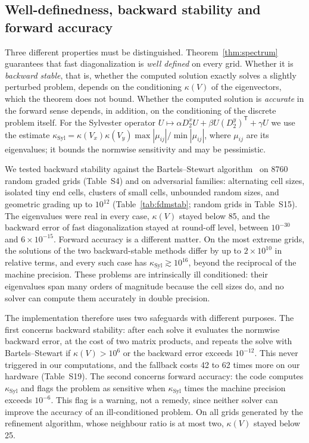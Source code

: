 \documentclass[smallextended,envcountsame]{svjour3}
\begin{document}
\subsection{Well-definedness, backward stability and forward accuracy}\label{sec:robust}
Three different properties must be distinguished. Theorem~\ref{thm:spectrum} guarantees that fast
diagonalization is \emph{well defined} on every grid. Whether it is \emph{backward stable}, that is, whether
the computed solution exactly solves a slightly perturbed problem, depends on the conditioning $\kappa(V)$ of
the eigenvectors, which the theorem does not bound. Whether the computed solution is \emph{accurate} in the
forward sense depends, in addition, on the conditioning of the discrete problem itself. For the Sylvester
operator $U\mapsto\alpha D_2^xU+\beta U(D_2^y)^{\mathsf T}+\gamma U$ we use the estimate
$\kappa_{\mathrm{Syl}}=\kappa(V_x)\kappa(V_y)\max|\mu_{ij}|/\min|\mu_{ij}|$, where $\mu_{ij}$ are its
eigenvalues; it bounds the normwise sensitivity and may be pessimistic.

We tested backward stability against the Bartels--Stewart algorithm~\cite{bartels1972solution} on 8760 random
graded grids (Table~S4) and on adversarial families: alternating cell sizes, isolated tiny end cells,
clusters of small cells, unbounded random sizes, and geometric grading up to $10^{12}$
(Table~\ref{tab:fdmstab}; random grids in Table~S15). The eigenvalues were real in every case, $\kappa(V)$
stayed below 85, and the backward error of fast diagonalization stayed at round-off level, between
$10^{-30}$ and $6\times10^{-15}$. Forward accuracy is a different matter. On the most extreme grids, the
solutions of the two backward-stable methods differ by up to $2\times10^{10}$ in relative terms, and every
such case has $\kappa_{\mathrm{Syl}}\gtrsim10^{16}$, beyond the reciprocal of the machine precision. These
problems are intrinsically ill conditioned: their eigenvalues span many orders of magnitude because the cell
sizes do, and no solver can compute them accurately in double precision.

The implementation therefore uses two safeguards with different purposes. The first concerns backward
stability: after each solve it evaluates the normwise backward error, at the cost of two matrix products,
and repeats the solve with Bartels--Stewart if $\kappa(V)>10^6$ or the backward error exceeds $10^{-12}$.
This never triggered in our computations, and the fallback costs 42 to 62 times more on our hardware (Table~S19). The second
concerns forward accuracy: the code computes $\kappa_{\mathrm{Syl}}$ and flags the problem as sensitive when
$\kappa_{\mathrm{Syl}}$ times the machine precision exceeds $10^{-6}$. This flag is a warning, not a remedy,
since neither solver can improve the accuracy of an ill-conditioned problem. On all grids generated by the
refinement algorithm, whose neighbour ratio is at most two, $\kappa(V)$ stayed below 25.
\end{document}
